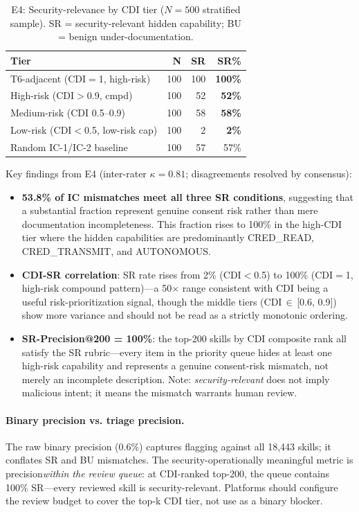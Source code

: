 \begin{table}[h]
\centering
\caption{E4: Security-relevance by CDI tier ($N{=}500$ stratified sample).
  SR = security-relevant hidden capability; BU = benign under-documentation.}
\label{tab:e4_sr}
\small
\begin{tabular}{@{}p{3.2cm}rrr@{}}
\toprule
\textbf{Tier} & \textbf{N} & \textbf{SR} & \textbf{SR\%} \\
\midrule
T6-adjacent (CDI$=$1, high-risk)  & 100 & 100 & \textbf{100\%} \\
High-risk (CDI$>$0.9, cmpd)       & 100 &  52 & \textbf{52\%} \\
Medium-risk (CDI 0.5--0.9)         & 100 &  58 & \textbf{58\%} \\
Low-risk (CDI$<$0.5, low-risk cap) & 100 &   2 & \textbf{2\%} \\
Random IC-1/IC-2 baseline          & 100 &  57 &  57\% \\
\bottomrule
\end{tabular}
\end{table}

\noindent Key findings from E4 (inter-rater $\kappa = 0.81$;
  disagreements resolved by consensus):
\begin{itemize}[topsep=2pt,itemsep=1pt]
\item \textbf{53.8\% of IC mismatches meet all three SR conditions}, suggesting
  that a substantial fraction represent genuine consent risk rather than
  mere documentation incompleteness. This fraction rises to 100\% in the
  high-CDI tier where the hidden capabilities are predominantly
  CRED\_READ, CRED\_TRANSMIT, and AUTONOMOUS.
\item \textbf{CDI-SR correlation}: SR rate rises from 2\% (CDI$<$0.5)
  to 100\% (CDI$=$1, high-risk compound pattern)---a 50$\times$ range
  consistent with CDI being a useful risk-prioritization signal,
  though the middle tiers (CDI\,$\in$\,[0.6, 0.9]) show more variance
  and should not be read as a strictly monotonic ordering.
\item \textbf{SR-Precision@200 = 100\%}: the top-200 skills by CDI
  composite rank all satisfy the SR rubric---every item in the
  priority queue hides at least one high-risk capability and
  represents a genuine consent-risk mismatch, not merely an
  incomplete description. Note: \emph{security-relevant} does not
  imply malicious intent; it means the mismatch warrants human review.
\end{itemize}

\paragraph{Binary precision vs. triage precision.}
The raw binary precision (0.6\%) captures flagging against all 18,443 skills;
it conflates SR and BU mismatches.
The security-operationally meaningful metric is precision\emph{within the review queue}:
at CDI-ranked top-200, the queue contains 100\% SR---every reviewed skill
is security-relevant.
Platforms should configure the review budget to cover the top-k CDI tier,
not use \sysname as a binary blocker.

